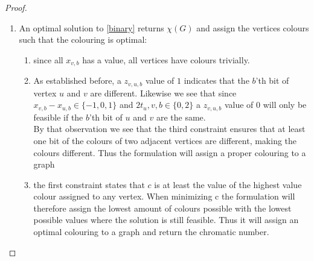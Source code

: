\begin{proposition}
\begin{proof}
\begin{enumerate}
\begin{enumerate}
\end{enumerate}
\item An optimal solution to \ref{binary} returns $\chi(G)$ and assign the vertices colours such that the colouring is optimal:\\
\begin{enumerate}
\item since all $x_{v,b}$ has a value, all vertices have colours trivially.
\item As established before, a $z_{v,u,b}$ value of $1$ indicates that the $b$'th bit of vertex $u$ and $v$ are different. Likewise we see that since $x_{v,b}-x_{u,b} \in \{-1,0,1\}$ and $2t_u,v,b \in \{0,2\}$ a $z_{v,u,b}$ value of $0$ will only be feasible if the $b$'th bit of $u$ and $v$ are the same. \\
By that observation we see that the third constraint ensures that at least one bit of the colours of two adjacent vertices are different, making the colours different. Thus the formulation will assign a proper colouring to a graph
\item  the first constraint states that $c$ is at least the value of the highest value colour assigned to any vertex. When minimizing c the formulation will therefore assign the lowest amount of colours possible with the lowest possible values where the solution is still feasible. Thus it will assign an optimal colouring to a graph and return the chromatic number. 
\end{enumerate}
\end{enumerate}
\end{proof}
\end{proposition}